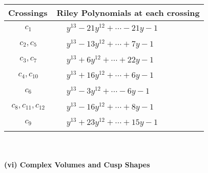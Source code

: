 \documentclass[1p]{elsarticle_modified}
\theoremstyle{definition}
\begin{document}
\begin{tabular}{m{50pt}|m{274pt}}
Crossings & \hspace{64pt}Riley Polynomials at each crossing \\
\hline $$\begin{aligned}c_{1}\end{aligned}$$&$\begin{aligned}
&y^{13}-21 y^{12}+\cdots-21 y-1
\end{aligned}$\\
\hline $$\begin{aligned}c_{2},c_{5}\end{aligned}$$&$\begin{aligned}
&y^{13}-13 y^{12}+\cdots+7 y-1
\end{aligned}$\\
\hline $$\begin{aligned}c_{3},c_{7}\end{aligned}$$&$\begin{aligned}
&y^{13}+6 y^{12}+\cdots+22 y-1
\end{aligned}$\\
\hline $$\begin{aligned}c_{4},c_{10}\end{aligned}$$&$\begin{aligned}
&y^{13}+16 y^{12}+\cdots+6 y-1
\end{aligned}$\\
\hline $$\begin{aligned}c_{6}\end{aligned}$$&$\begin{aligned}
&y^{13}-3 y^{12}+\cdots-6 y-1
\end{aligned}$\\
\hline $$\begin{aligned}c_{8},c_{11},c_{12}\end{aligned}$$&$\begin{aligned}
&y^{13}-16 y^{12}+\cdots+8 y-1
\end{aligned}$\\
\hline $$\begin{aligned}c_{9}\end{aligned}$$&$\begin{aligned}
&y^{13}+23 y^{12}+\cdots+15 y-1
\end{aligned}$\\
\hline
\end{tabular}\\~\\
\newpage\flushleft \textbf{(vi) Complex Volumes and Cusp Shapes}
\end{document}
